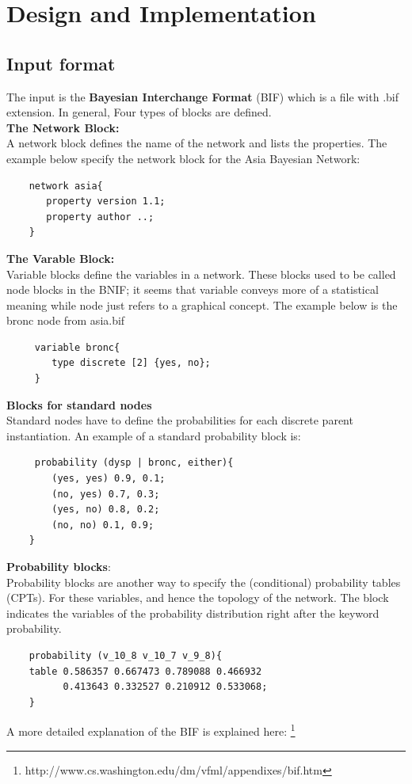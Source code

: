 \newpage
\section{Design and Implementation}
    \subsection{Input format}
    The input is the \textbf{Bayesian Interchange Format} (BIF) which is a file with .bif extension.
    In general, Four types of blocks are defined.\\
    \noindent \textbf{The Network Block:}\\
    A network block defines the name of the network and lists the properties. The example below specify the network block for the Asia Bayesian Network:
    \begin{lstlisting}
    network asia{
       property version 1.1;
       property author ..;
    }
    \end{lstlisting}

    \noindent \textbf{The Varable Block:}\\
    Variable blocks define the variables in a network. These blocks used
    to be called node blocks in the BNIF; it seems that variable conveys
    more of a statistical meaning while node just refers to a graphical
    concept. The example below is the bronc node from asia.bif
    \begin{lstlisting}
     variable bronc{
        type discrete [2] {yes, no};
     }
    \end{lstlisting}

    \noindent \textbf{Blocks for standard nodes}\\
    Standard nodes have to define the probabilities for each discrete parent instantiation. An example of a standard probability block is:
    \begin{lstlisting}
     probability (dysp | bronc, either){
        (yes, yes) 0.9, 0.1;
        (no, yes) 0.7, 0.3;
        (yes, no) 0.8, 0.2;
        (no, no) 0.1, 0.9;
    }
    \end{lstlisting}

    \noindent \textbf{Probability blocks}:\\
    Probability blocks are another way to specify the (conditional) probability tables (CPTs). For these variables, and hence the topology of the network. The block indicates the variables of the probability distribution right after the keyword probability.
    \begin{lstlisting}
    probability (v_10_8 v_10_7 v_9_8){
	table 0.586357 0.667473 0.789088 0.466932
	      0.413643 0.332527 0.210912 0.533068;
    }
    \end{lstlisting}
    A more detailed explanation of the BIF is explained here: \footnote{http://www.cs.washington.edu/dm/vfml/appendixes/bif.htm} \\

